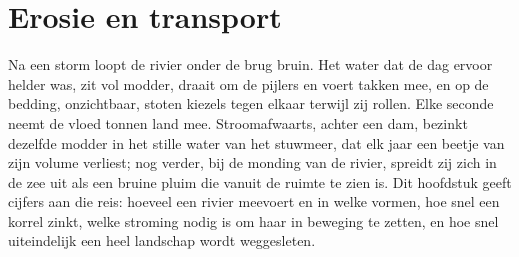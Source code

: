 \chapter{Erosie en transport}\label{ch:b1:erosion-transport}

Na een storm loopt de rivier onder de brug bruin. Het water dat de dag ervoor helder was, zit vol modder, draait om de pijlers en voert takken mee, en op de bedding, onzichtbaar, stoten kiezels tegen elkaar terwijl zij rollen. Elke seconde neemt de vloed tonnen land mee. Stroomafwaarts, achter een dam, bezinkt dezelfde modder in het stille water van het stuwmeer, dat elk jaar een beetje van zijn volume verliest; nog verder, bij de monding van de rivier, spreidt zij zich in de zee uit als een bruine pluim die vanuit de ruimte te zien is. Dit hoofdstuk geeft cijfers aan die reis: hoeveel een rivier meevoert en in welke vormen, hoe snel een korrel zinkt, welke stroming nodig is om haar in beweging te zetten, en hoe snel uiteindelijk een heel landschap wordt weggesleten.

